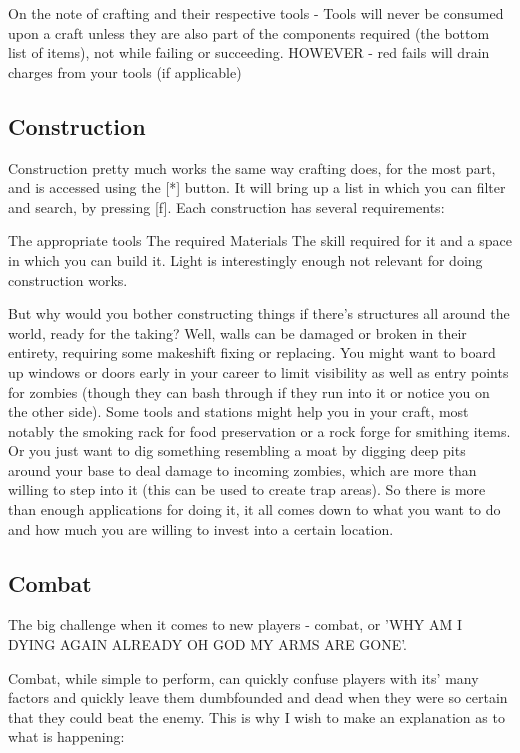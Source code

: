 On the note of crafting and their respective tools - Tools will never be consumed upon a craft unless they are also part of the components required (the bottom list of items), not while failing or succeeding. HOWEVER - red fails will drain charges from your tools (if applicable)

\subsection{Construction}

Construction pretty much works the same way crafting does, for the most part, and is accessed using the [*] button. It will bring up a list in which you can filter and search, by pressing [f]. Each construction has several requirements:

The appropriate tools
The required Materials
The skill required for it
and a space in which you can build it.
Light is interestingly enough not relevant for doing construction works.

But why would you bother constructing things if there's structures all around the world, ready for the taking? Well, walls can be damaged or broken in their entirety, requiring some makeshift fixing or replacing. You might want to board up windows or doors early in your career to limit visibility as well as entry points for zombies (though they can bash through if they run into it or notice you on the other side). Some tools and stations might help you in your craft, most notably the smoking rack for food preservation or a rock forge for smithing items. Or you just want to dig something resembling a moat by digging deep pits around your base to deal damage to incoming zombies, which are more than willing to step into it (this can be used to create trap areas). So there is more than enough applications for doing it, it all comes down to what you want to do and how much you are willing to invest into a certain location.

\subsection{Combat}

The big challenge when it comes to new players - combat, or 'WHY AM I DYING AGAIN ALREADY OH GOD MY ARMS ARE GONE'.

Combat, while simple to perform, can quickly confuse players with its' many factors and quickly leave them dumbfounded and dead when they were so certain that they could beat the enemy. This is why I wish to make an explanation as to what is happening:

